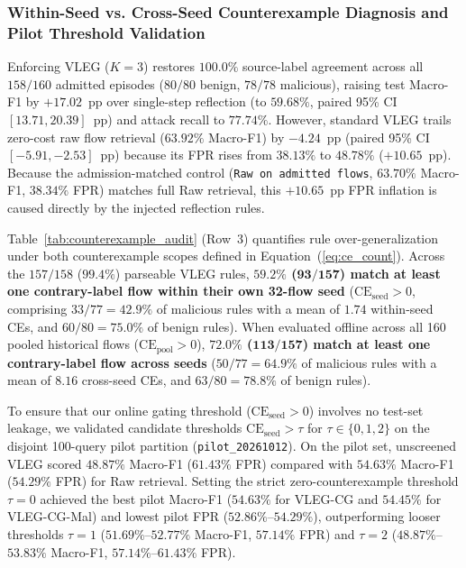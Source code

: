 \documentclass[10pt,a4paper,onecolumn]{article}
\theoremstyle{definition}
\theoremstyle{remark}
\begin{document}
\subsubsection{Within-Seed vs. Cross-Seed Counterexample Diagnosis and Pilot Threshold Validation}
Enforcing VLEG ($K=3$) restores $100.0\%$ source-label agreement across all $158/160$ admitted episodes ($80/80$ benign, $78/78$ malicious), raising test Macro-F1 by $+17.02$~pp over single-step reflection (to $59.68\%$, paired 95\% CI $[13.71, 20.39]$~pp) and attack recall to $77.74\%$. However, standard VLEG trails zero-cost raw flow retrieval ($63.92\%$ Macro-F1) by $-4.24$~pp (paired 95\% CI $[-5.91, -2.53]$~pp) because its FPR rises from $38.13\%$ to $48.78\%$ ($+10.65$~pp). Because the admission-matched control (\texttt{Raw on admitted flows}, $63.70\%$ Macro-F1, $38.34\%$ FPR) matches full Raw retrieval, this $+10.65$~pp FPR inflation is caused directly by the injected reflection rules.

Table~\ref{tab:counterexample_audit} (Row~3) quantifies rule over-generalization under both counterexample scopes defined in Equation~(\ref{eq:ce_count}). Across the $157/158$ ($99.4\%$) parseable VLEG rules, \textbf{$59.2\%$ ($\boldsymbol{93/157}$) match at least one contrary-label flow within their own 32-flow seed} ($\mathrm{CE}_{\mathrm{seed}} > 0$, comprising $33/77 = 42.9\%$ of malicious rules with a mean of $1.74$ within-seed CEs, and $60/80 = 75.0\%$ of benign rules). When evaluated offline across all 160 pooled historical flows ($\mathrm{CE}_{\mathrm{pool}} > 0$), \textbf{$72.0\%$ ($\boldsymbol{113/157}$) match at least one contrary-label flow across seeds} ($50/77 = 64.9\%$ of malicious rules with a mean of $8.16$ cross-seed CEs, and $63/80 = 78.8\%$ of benign rules).

To ensure that our online gating threshold ($\mathrm{CE}_{\mathrm{seed}} > 0$) involves no test-set leakage, we validated candidate thresholds $\mathrm{CE}_{\mathrm{seed}} > \tau$ for $\tau \in \{0, 1, 2\}$ on the disjoint 100-query pilot partition (\texttt{pilot\_20261012}). On the pilot set, unscreened VLEG scored $48.87\%$ Macro-F1 ($61.43\%$ FPR) compared with $54.63\%$ Macro-F1 ($54.29\%$ FPR) for Raw retrieval. Setting the strict zero-counterexample threshold $\tau = 0$ achieved the best pilot Macro-F1 ($54.63\%$ for VLEG-CG and $54.45\%$ for VLEG-CG-Mal) and lowest pilot FPR ($52.86\%$--$54.29\%$), outperforming looser thresholds $\tau = 1$ ($51.69\%$--$52.77\%$ Macro-F1, $57.14\%$ FPR) and $\tau = 2$ ($48.87\%$--$53.83\%$ Macro-F1, $57.14\%$--$61.43\%$ FPR).
\end{document}
